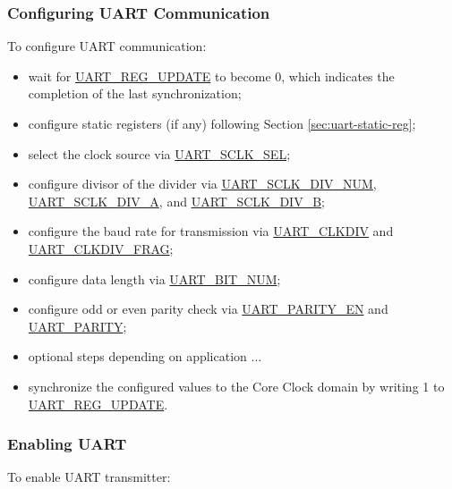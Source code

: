 \documentclass[main\_\_EN.tex]{subfiles}
\begin{document}
\subsubsection{Configuring UART Communication}

To configure UART communication:

\begin{itemize}
    \item wait for \hyperref[fielddesc:UARTREGUPDATE]{UART\_REG\_UPDATE} to become 0, which indicates the completion of the last synchronization;
    \item configure static registers (if any) following Section \ref{sec:uart-static-reg};
    \item select the clock source via \hyperref[fielddesc:UARTSCLKSEL]{UART\_SCLK\_SEL};
    \item configure divisor of the divider via \hyperref[fielddesc:UARTSCLKDIVNUM]{UART\_SCLK\_DIV\_NUM}, \hyperref[fielddesc:UARTSCLKDIVA]{UART\_SCLK\_DIV\_A}, and \hyperref[fielddesc:UARTSCLKDIVB]{UART\_SCLK\_DIV\_B};
    \item configure the baud rate for transmission via \hyperref[fielddesc:UARTCLKDIV]{UART\_CLKDIV} and \hyperref[fielddesc:UARTCLKDIVFRAG]{UART\_CLKDIV\_FRAG};
    \item configure data length via \hyperref[fielddesc:UARTBITNUM]{UART\_BIT\_NUM};
    \item configure odd or even parity check via \hyperref[fielddesc:UARTPARITYEN]{UART\_PARITY\_EN} and \hyperref[fielddesc:UARTPARITY]{UART\_PARITY};
    \item optional steps depending on application ...
    \item synchronize the configured values to the Core Clock domain by writing 1 to \hyperref[fielddesc:UARTREGUPDATE]{UART\_REG\_UPDATE}.
\end{itemize}

\subsubsection{Enabling UART}

To enable UART transmitter:
\end{document}
